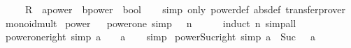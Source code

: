 \begin{isabellebody}
\ \ \ \ \ R\ {\isacharcolon}{\kern0pt}{\isacharcolon}{\kern0pt}\ {\isacartoucheopen}{\isacharprime}{\kern0pt}a{\isacharcolon}{\kern0pt}{\isacharcolon}{\kern0pt}power\ {\isasymRightarrow}\ {\isacharprime}{\kern0pt}b{\isacharcolon}{\kern0pt}{\isacharcolon}{\kern0pt}power\ {\isasymRightarrow}\ bool{\isacartoucheclose}\isanewline
%
\isadelimproof
\ \ %
\endisadelimproof
%
\isatagproof
{}\isamarkupfalse%
\ {\isacharparenleft}{\kern0pt}simp\ only{\isacharcolon}{\kern0pt}\ power{\isacharunderscore}{\kern0pt}def\ {\isacharbrackleft}{\kern0pt}abs{\isacharunderscore}{\kern0pt}def{\isacharbrackright}{\kern0pt}{\isacharparenright}{\kern0pt}\ transfer{\isacharunderscore}{\kern0pt}prover%
\endisatagproof
{\isafoldproof}%
%
\isadelimproof
\isanewline
%
\endisadelimproof
\isanewline
{}\isamarkupfalse%
\isanewline
\isanewline
{}\isamarkupfalse%
\ monoid{\isacharunderscore}{\kern0pt}mult\isanewline
{}\isanewline
\isanewline
{}\isamarkupfalse%
\ power%
\isadelimproof
\ %
\endisadelimproof
%
\isatagproof
\isacommand{{\isachardot}{\kern0pt}}\isamarkupfalse%
%
\endisatagproof
{\isafoldproof}%
%
\isadelimproof
%
\endisadelimproof
\isanewline
\isanewline
{}\isamarkupfalse%
\ power{\isacharunderscore}{\kern0pt}one\ {\isacharbrackleft}{\kern0pt}simp{\isacharbrackright}{\kern0pt}{\isacharcolon}{\kern0pt}\ {\isachardoublequoteopen}{}\ {\isacharcircum}{\kern0pt}\ n\ {\isacharequal}{\kern0pt}\ {}{\isachardoublequoteclose}\isanewline
%
\isadelimproof
\ \ %
\endisadelimproof
%
\isatagproof
{}\isamarkupfalse%
\ {\isacharparenleft}{\kern0pt}induct\ n{\isacharparenright}{\kern0pt}\ simp{\isacharunderscore}{\kern0pt}all%
\endisatagproof
{\isafoldproof}%
%
\isadelimproof
\isanewline
%
\endisadelimproof
\isanewline
{}\isamarkupfalse%
\ power{\isacharunderscore}{\kern0pt}one{\isacharunderscore}{\kern0pt}right\ {\isacharbrackleft}{\kern0pt}simp{\isacharbrackright}{\kern0pt}{\isacharcolon}{\kern0pt}\ {\isachardoublequoteopen}a\ {\isacharcircum}{\kern0pt}\ {}\ {\isacharequal}{\kern0pt}\ a{\isachardoublequoteclose}\isanewline
%
\isadelimproof
\ \ %
\endisadelimproof
%
\isatagproof
{}\isamarkupfalse%
\ simp%
\endisatagproof
{\isafoldproof}%
%
\isadelimproof
\isanewline
%
\endisadelimproof
\isanewline
{}\isamarkupfalse%
\ power{\isacharunderscore}{\kern0pt}Suc{}{\isacharunderscore}{\kern0pt}right\ {\isacharbrackleft}{\kern0pt}simp{\isacharbrackright}{\kern0pt}{\isacharcolon}{\kern0pt}\ {\isachardoublequoteopen}a\ {\isacharcircum}{\kern0pt}\ Suc\ {}\ {\isacharequal}{\kern0pt}\ a{\isachardoublequoteclose}\isanewline

\end{isabellebody}
